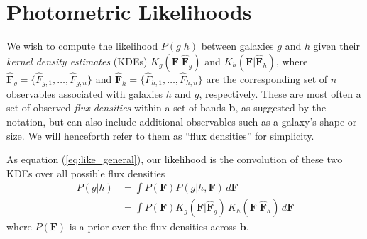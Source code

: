 \documentclass[a4paper,fleqn,usenatbib,english]{mnras}
\newcommand{\pz}{photo-$z$} %
\begin{document}

\section{Photometric Likelihoods}
\label{sec:mod}




We wish to compute the likelihood $P(g|h)$ between galaxies $g$ and $h$ given their \textit{kernel density estimates} (KDEs) $K_g(\mathbf{F}|\mathbf{\hat{F}}_g)$ and $K_h(\mathbf{F}|\mathbf{\hat{F}}_h)$, where $\mathbf{\hat{F}}_g = \lbrace \hat{F}_{g,1},\ldots,\hat{F}_{g,n} \rbrace$ and $\mathbf{\hat{F}}_h=\lbrace \hat{F}_{h,1},\ldots,\hat{F}_{h,n} \rbrace$ are the corresponding set of $n$ observables associated with galaxies $h$ and $g$, respectively. These are most often a set of observed \textit{flux densities} within a set of bands $\mathbf{b}$, as suggested by the notation, but can also include additional observables such as a galaxy's shape or size. We will henceforth refer to them as ``flux densities'' for simplicity.

As equation (\ref{eq:like_general}), our likelihood is the convolution of these two KDEs over all possible flux densities
\begin{align}
P(g|h) &= \int P(\mathbf{F}) P(g|h,\mathbf{F}) \, d\mathbf{F} \nonumber \\
&= \int P(\mathbf{F}) K_g(\mathbf{F}|\mathbf{\hat{F}}_g) \,  K_h(\mathbf{F}|\mathbf{\hat{F}}_h) \, d\mathbf{F} \label{eq:likelihood} 
\end{align}
where $P(\mathbf{F})$ is a prior over the flux densities across $\mathbf{b}$.
\end{document}
